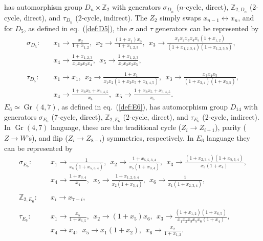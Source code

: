\documentclass[11pt]{article}
\DeclareMathOperator{\Gr}{Gr}
\begin{document}
has automorphism group $D_n \times \mathbb{Z}_2$ with generators $\sigma_{D_n}$ ($n$-cycle, direct), $\mathbb{Z}_{2,D_n}$ (2-cycle, direct), and $\tau_{D_n}$ (2-cycle, indirect). The $Z_2$ simply swaps $x_{n-1} \leftrightarrow x_n$, and for $D_5$, as defined in eq.~(\ref{def:D5}), the $\sigma$ and $\tau$ generators can be represented by
\begin{equation}
\begin{split}
  \sigma_{D_5}:\quad& 
    x_1\to \frac{x_2}{1+x_{1,2}},~~
    x_2\to \frac{(1+x_1) x_3}{1+x_{1,2,3}},~~
    x_3\to \frac{x_1 x_2 x_3 x_4 x_5 (1+x_{1,2})}{(1+x_{1,2,3,4}) (1+x_{1,2,3,5})},\\&
    x_4\to \frac{1+x_{1,2,3}}{x_1 x_2 x_3 x_4},~~
    x_5\to \frac{1+x_{1,2,3}}{x_1 x_2 x_3 x_5},\\ \\
  \tau_{D_5}:\quad& 
    x_1\to x_1,~~
    x_2\to \frac{1+x_1}{x_1 x_2 (1+x_3 x_5+x_{3,4,5})},~~
    x_3\to \frac{x_3 x_4 x_5}{(1+x_{3,4}) (1+x_{3,5})},\\&
    x_4\to \frac{1+x_3 x_5+x_{3,4,5}}{x_4},~~
    x_5\to \frac{1+x_3 x_5+x_{3,4,5}}{x_5}.
\end{split}  
\end{equation}
$E_6 \simeq \Gr(4,7)$, as defined in eq.~(\ref{def:E6}), has automorphism group $D_{14}$ with generators $\sigma_{E_6}$ (7-cycle, direct), $\mathbb{Z}_{2,E_6}$ (2-cycle, direct), and $\tau_{E_6}$ (2-cycle, indirect). In $\Gr(4,7)$ language, these are the traditional cycle ($Z_i \to Z_{i+1}$), parity ($Z \to W$'s), and flip ($Z_i \to Z_{8-i}$) symmetries, respectively. In $E_6$ language they can be represented by 
\begin{equation}
\begin{split}
  \sigma_{E_6}:\quad& 
    x_1\to \frac{1}{x_6 (1+x_{5,3,4})},~~
    x_2\to \frac{1+x_{6,5,3,4}}{x_5 (1+x_{3,4})},~~
    x_3\to \frac{(1+x_{2,3,4}) (1+x_{5,3,4})}{x_3 (1+x_4)},\\&
    x_4\to \frac{1+x_{3,4}}{x_4},~~
    x_5\to \frac{1+x_{1,2,3,4}}{x_2 (1+x_{3,4})},~~
    x_6\to \frac{1}{x_1 (1+x_{2,3,4})},\\ \\
  \mathbb{Z}_{2,E_6}:\quad& 
    x_i\to x_{7-i},\\ \\
  \tau_{E_6}:\quad& 
    x_1\to \frac{x_5}{1+x_{6,5}},~~
    x_2\to (1+x_5) x_6,~~
    x_3\to \frac{(1+x_{1,2}) (1+x_{6,5})}{x_1 x_2 x_3 x_5 x_6 (1+x_4)},\\&
    x_4\to x_4,~~
    x_5\to x_1 (1+x_2),~~
    x_6\to \frac{x_2}{1+x_{1,2}}.
\end{split}  
\end{equation}
\end{document}
